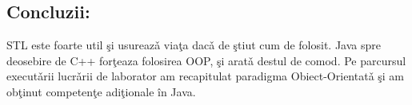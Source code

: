 \subsection{Concluzii:}
STL este foarte util \c{s}i usureaz\v{a} via\c{t}a dac\v{a} de \c{s}tiut cum de folosit. Java spre deosebire de C++ for\c{t}eaza folosirea OOP, \c{s}i arat\v{a} destul de comod. Pe parcursul execut\v{a}rii lucr\v{a}rii de laborator am recapitulat
paradigma Obiect-Orientat\v{a} \c{s}i am ob\c{t}inut competen\c{t}e adi\c{t}ionale \^{i}n Java.
